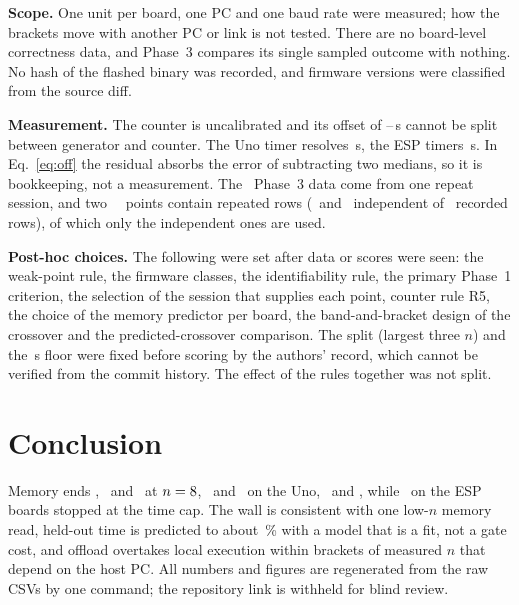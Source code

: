 \documentclass[conference,a4paper,10pt]{IEEEtran}
\begin{document}
\textbf{Scope.} One unit per board, one PC and one baud rate were measured; how the brackets move with another PC or link is not tested. There are no board-level correctness data, and Phase~3 compares its single sampled outcome with nothing. No hash of the flashed binary was recorded, and firmware versions were classified from the source diff.

\textbf{Measurement.} The counter is uncalibrated and its offset of \SelfTestLo--\SelfTestHi\,\textmu s cannot be split between generator and counter. The Uno timer resolves \UnoResUs\,\textmu s, the ESP timers \EspResUs\,\textmu s. In Eq.~\eqref{eq:off} the residual absorbs the error of subtracting two medians, so it is bookkeeping, not a measurement. The \espA\ Phase~3 data come from one repeat session, and two \espB\ \grover\ points contain repeated rows (\DupNineIndep\ and \DupTenIndep\ independent of \DupNineRows\ recorded rows), of which only the independent ones are used.

\textbf{Post-hoc choices.} The following were set after data or scores were seen: the weak-point rule, the firmware classes, the identifiability rule, the primary Phase~1 criterion, the selection of the session that supplies each point, counter rule R5, the choice of the memory predictor per board, the band-and-bracket design of the crossover and the predicted-crossover comparison. The split (largest three $n$) and the \ModelFloorUs\,\textmu s floor were fixed before scoring by the authors' record, which cannot be verified from the commit history. The effect of the rules together was not split.

\section{Conclusion}
Memory ends \hall, \bell\ and \qft\ at $n=8$, \MemWallEspLo\ and \MemWallEspHi\ on the Uno, \espA\ and \espB, while \grover\ on the ESP boards stopped at the time cap. The wall is consistent with one low-$n$ memory read, held-out time is predicted to about \MapeTwoClean\,\% with a model that is a fit, not a gate cost, and offload overtakes local execution within brackets of measured $n$ that depend on the host PC. All numbers and figures are regenerated from the raw CSVs by one command; the repository link is withheld for blind review.



\end{document}
